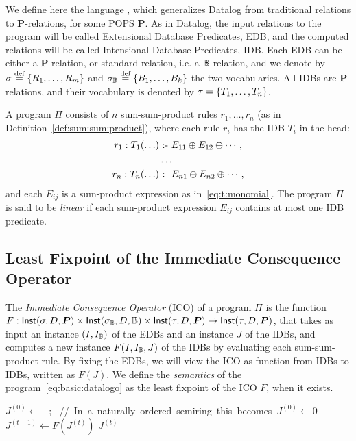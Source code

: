 We define here the language \datalogo, which generalizes Datalog from
traditional relations to $\bm P$-relations, for some POPS $\bm P$.  As
in Datalog, the input relations to the program will be called
Extensional Database Predicates, EDB, and the computed relations will
be called Intensional Database Predicates, IDB.  Each EDB can be
either a $\bm P$-relation, or standard relation, i.e. a $\mathbb B$-relation,
and we denote by $\sigma \stackrel{\text{def}}{=} \{R_1, \ldots, R_m\}$ and
$\sigma_\mathbb B \stackrel{\text{def}}{=} \{B_1, \ldots, B_k\}$ the two vocabularies.  All
IDBs are $\bm P$-relations, and their vocabulary is denoted by
$\tau = \{T_1, \ldots, T_n\}$.

A \datalogo program $\Pi$ consists of $n$ sum-sum-product rules
$r_1, \ldots, r_n$ (as in Definition~\ref{def:sum:sum:product}), where
each rule $r_i$ has the IDB $T_i$ in the head:
%
\begin{align}
  r_1: T_1(\ldots) & \text{ :- } E_{11}\oplus E_{12} \oplus \cdots, \nonumber \\
       & \ldots \label{eq:basic:datalogo} \\
  r_n: T_n(\ldots) & \text{ :- } E_{n1} \oplus E_{n2} \oplus \cdots, \nonumber
\end{align}
%
and each $E_{ij}$ is a sum-product expression as
in~\eqref{eq:t:monomial}.  The program $\Pi$ is said to be {\em
  linear} if each sum-product expression $E_{ij}$ contains at most one
IDB predicate.

\subsection{Least Fixpoint of the Immediate Consequence Operator}

\label{subsec:ico}

The {\em Immediate Consequence Operator} (ICO) of a program
$\Pi$ is the function
$F : \textsf{Inst}(\sigma,D,\bm P) \times \textsf{Inst}(\sigma_\mathbb B,D,\mathbb B) \times
\textsf{Inst}(\tau,D,\bm P) \rightarrow \textsf{Inst}(\tau,D,\bm P)$, that takes as
input an instance $(I, I_\mathbb B)$ of the EDBs and an instance $J$ of the
IDBs, and computes a new instance $F(I,I_\mathbb B,J)$ of the IDBs by
evaluating each sum-sum-product rule.  By fixing the EDBs, we will
view the ICO as function from IDBs to IDBs, written as $F(J)$. We
define the {\em semantics} of the \datalogo
program~\eqref{eq:basic:datalogo} as the least fixpoint of the ICO
$F$, when it exists.

\begin{algorithm}[th]
     $J^{(0)} \leftarrow \bot\mbox{;}$ \mbox{\hspace{2cm} // In a naturally ordered  semiring this becomes $J^{(0)} \leftarrow 0$}\\
    {
         {$J^{(t+1)} \leftarrow F(J^{(t)})$}\;
    }
    \Return $J^{(t)}$
    \caption{Na\"ive evaluation for \datalogo
    }
    \label{algo:naive}
\end{algorithm}

